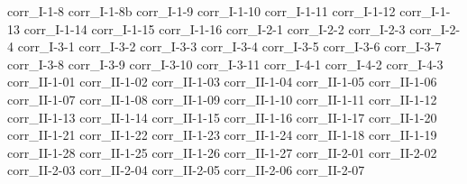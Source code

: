 {corr_I-1-8}
{corr_I-1-8b}
{corr_I-1-9}
{corr_I-1-10}
{corr_I-1-11}
{corr_I-1-12}
{corr_I-1-13}
{corr_I-1-14}
{corr_I-1-15}
{corr_I-1-16}
{corr_I-2-1}
{corr_I-2-2}
{corr_I-2-3}
{corr_I-2-4}
{corr_I-3-1}
{corr_I-3-2}
{corr_I-3-3}
{corr_I-3-4}
{corr_I-3-5}
{corr_I-3-6}
{corr_I-3-7}
{corr_I-3-8}
{corr_I-3-9}
{corr_I-3-10}
{corr_I-3-11}
{corr_I-4-1}
{corr_I-4-2}
{corr_I-4-3}
{corr_II-1-01}
{corr_II-1-02}
{corr_II-1-03}
{corr_II-1-04}
{corr_II-1-05}
{corr_II-1-06}
{corr_II-1-07}
{corr_II-1-08}
{corr_II-1-09}
{corr_II-1-10}
{corr_II-1-11}
{corr_II-1-12}
{corr_II-1-13}
{corr_II-1-14}
{corr_II-1-15}
{corr_II-1-16}
{corr_II-1-17}
{corr_II-1-20}
{corr_II-1-21}
{corr_II-1-22}
{corr_II-1-23}
{corr_II-1-24}
{corr_II-1-18}
{corr_II-1-19}
{corr_II-1-28}
{corr_II-1-25}
{corr_II-1-26}
{corr_II-1-27}
{corr_II-2-01}
{corr_II-2-02}
{corr_II-2-03}
{corr_II-2-04}
{corr_II-2-05}
{corr_II-2-06}
{corr_II-2-07}
